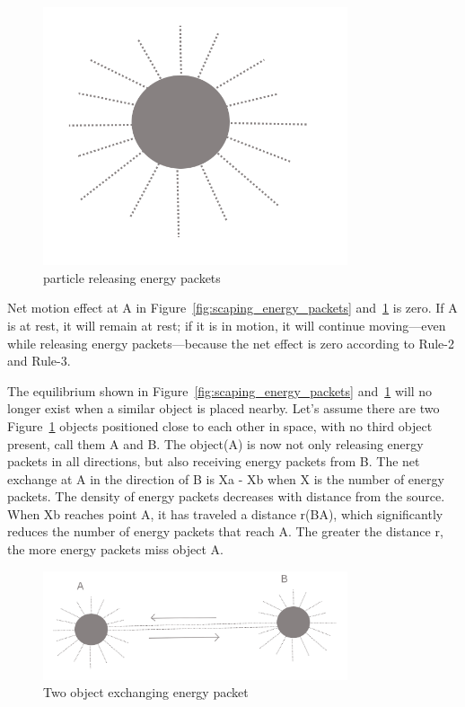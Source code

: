 \documentclass{article}
\begin{document}
    \begin{figure}[H]
        \centering
        \includegraphics[width=0.8\textwidth]{images/energy-packet release}
        \caption{particle releasing energy packets}
        \label{fig:energy_packet_single_object}
    \end{figure}

    Net motion effect at A in Figure~\ref{fig:scaping_energy_packets} and~\ref{fig:energy_packet_single_object}  is zero.
    If A is at rest, it will remain at rest; if it is in motion, it will continue moving—even while releasing energy packets—because the net effect is zero according to Rule-2 and Rule-3.

    The equilibrium shown in Figure~\ref{fig:scaping_energy_packets} and~\ref{fig:energy_packet_single_object} will no longer exist when a similar object is placed nearby.
    Let’s assume there are two Figure~\ref{fig:energy_packet_single_object} objects positioned close to each other in space, with no third object present, call them A and B. The object(A) is now not only releasing energy packets in all directions, but also receiving energy packets from B. The net exchange at A in the direction of B is Xa - Xb when X is the number of energy packets.
    The density of energy packets decreases with distance from the source.
    When Xb reaches point A, it has traveled a distance r(BA), which significantly reduces the number of energy packets that reach A. The greater the distance r, the more energy packets miss object A\@.

    \begin{figure}[H]
        \centering
        \includegraphics[width=0.8\textwidth]{images/gravity_between_two_object}
        \caption{Two object exchanging energy packet}
        \label{fig:gravity_between_two_object}
    \end{figure}
\end{document}
